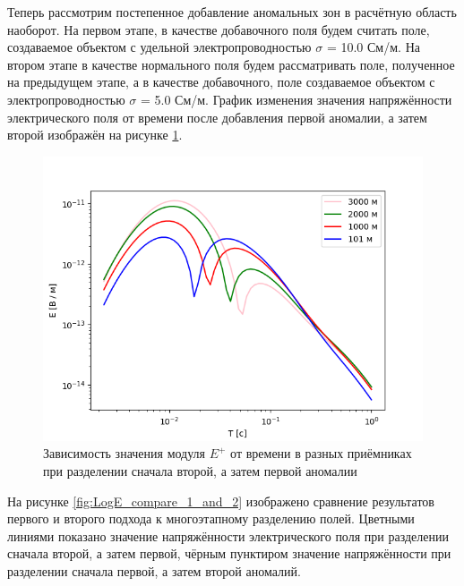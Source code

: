 Теперь рассмотрим постепенное добавление аномальных зон в расчётную область наоборот. На первом этапе, в качестве добавочного поля будем считать поле, создаваемое объектом с удельной электропроводностью $\sigma$ = 10.0 См/м. На втором этапе в качестве нормального поля будем рассматривать поле, полученное на предыдущем этапе, а в качестве добавочного, поле создаваемое объектом с электропроводностью $\sigma$ = 5.0 См/м. График изменения значения напряжённости электрического поля от времени после добавления первой аномалии, а затем второй изображён на рисунке \ref{fig:LogE_2_plus_1}.

\begin{figure}
	\centering
	\vspace*{0.7cm}
	\includegraphics[width=0.75\linewidth]{images/Log_E_2_plus_1.png}
	\caption{Зависимость значения модуля $E^+$ от времени в разных приёмниках при разделении сначала второй, а затем первой аномалии}
	\label{fig:LogE_2_plus_1}
\end{figure} 

На рисунке \ref{fig:LogE_compare_1_and_2} изображено сравнение результатов первого и второго подхода к многоэтапному разделению полей. Цветными линиями показано значение напряжённости электрического поля при разделении сначала второй, а затем первой, чёрным пунктиром значение напряжённости при разделении сначала первой, а затем второй аномалий.

